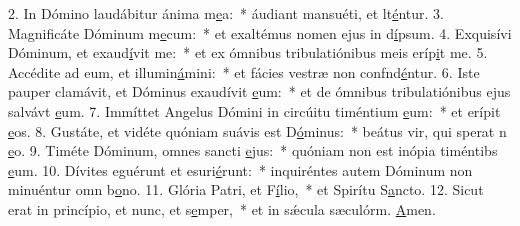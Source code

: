 2. In Dómino laudábitur ánima m\uline{e}a:~* áudiant mansuéti, et lt\uline{é}ntur.
3. Magnificáte Dóminum m\uline{e}cum:~* et exaltémus nomen ejus in d\uline{í}psum.
4. Exquisívi Dóminum, et exaud\uline{í}vit me:~* et ex ómnibus tribulatiónibus meis eríp\uline{i}t me.
5. Accédite ad eum, et illumin\uline{á}mini:~* et fácies vestræ non confnd\uline{é}ntur.
6. Iste pauper clamávit, et Dóminus exaudívit \uline{e}um:~* et de ómnibus tribulatiónibus ejus salvávt \uline{e}um.
7. Immíttet Angelus Dómini in circúitu timéntium \uline{e}um:~* et erípit \uline{e}os.
8. Gustáte, et vidéte quóniam suávis est D\uline{ó}minus:~* beátus vir, qui sperat n \uline{e}o.
9. Timéte Dóminum, omnes sancti \uline{e}jus:~* quóniam non est inópia timéntibs \uline{e}um.
10. Dívites eguérunt et esuri\uline{é}runt:~* inquiréntes autem Dóminum non minuéntur omn b\uline{o}no.
11. Glória Patri, et F\uline{í}lio,~* et Spirítu S\uline{a}ncto.
12. Sicut erat in princípio, et nunc, et s\uline{e}mper,~* et in sǽcula sæculórm. \uline{A}men.
